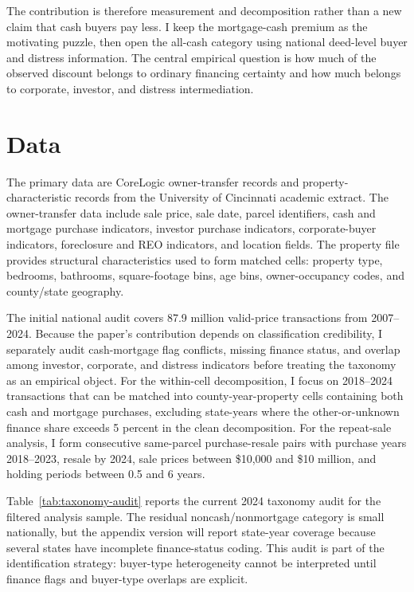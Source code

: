 \documentclass[12pt, letterpaper]{article}
\begin{document}
The contribution is therefore measurement and decomposition rather than a new claim that cash buyers pay less. I keep the mortgage-cash premium as the motivating puzzle, then open the all-cash category using national deed-level buyer and distress information. The central empirical question is how much of the observed discount belongs to ordinary financing certainty and how much belongs to corporate, investor, and distress intermediation.

\section{Data}\label{sec:data}

The primary data are CoreLogic owner-transfer records and property-characteristic records from the University of Cincinnati academic extract. The owner-transfer data include sale price, sale date, parcel identifiers, cash and mortgage purchase indicators, investor purchase indicators, corporate-buyer indicators, foreclosure and REO indicators, and location fields. The property file provides structural characteristics used to form matched cells: property type, bedrooms, bathrooms, square-footage bins, age bins, owner-occupancy codes, and county/state geography.

The initial national audit covers 87.9 million valid-price transactions from 2007--2024. Because the paper's contribution depends on classification credibility, I separately audit cash-mortgage flag conflicts, missing finance status, and overlap among investor, corporate, and distress indicators before treating the taxonomy as an empirical object. For the within-cell decomposition, I focus on 2018--2024 transactions that can be matched into county-year-property cells containing both cash and mortgage purchases, excluding state-years where the other-or-unknown finance share exceeds 5 percent in the clean decomposition. For the repeat-sale analysis, I form consecutive same-parcel purchase-resale pairs with purchase years 2018--2023, resale by 2024, sale prices between \$10,000 and \$10 million, and holding periods between 0.5 and 6 years.

Table~\ref{tab:taxonomy-audit} reports the current 2024 taxonomy audit for the filtered analysis sample. The residual noncash/nonmortgage category is small nationally, but the appendix version will report state-year coverage because several states have incomplete finance-status coding. This audit is part of the identification strategy: buyer-type heterogeneity cannot be interpreted until finance flags and buyer-type overlaps are explicit.
\end{document}
